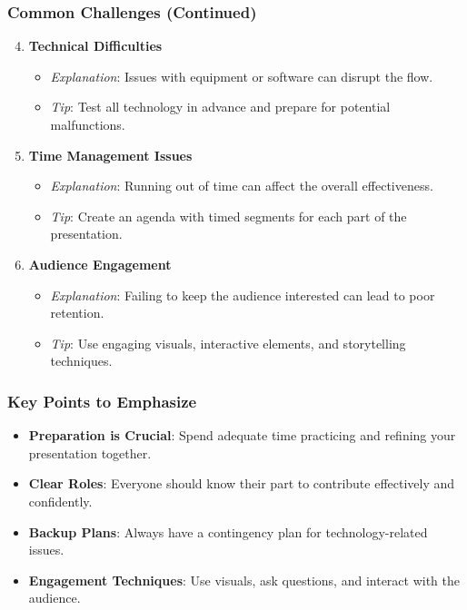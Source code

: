 \documentclass[aspectratio=169]{beamer}
\begin{document}
\begin{frame}[fragile]
  \frametitle{Common Challenges (Continued)}
  \begin{enumerate}
    \setcounter{enumi}{3} %
    \item \textbf{Technical Difficulties}
      \begin{itemize}
        \item \textit{Explanation}: Issues with equipment or software can disrupt the flow.
        \item \textit{Tip}: Test all technology in advance and prepare for potential malfunctions.
      \end{itemize}
    
    \item \textbf{Time Management Issues}
      \begin{itemize}
        \item \textit{Explanation}: Running out of time can affect the overall effectiveness.
        \item \textit{Tip}: Create an agenda with timed segments for each part of the presentation.
      \end{itemize}

    \item \textbf{Audience Engagement}
      \begin{itemize}
        \item \textit{Explanation}: Failing to keep the audience interested can lead to poor retention.
        \item \textit{Tip}: Use engaging visuals, interactive elements, and storytelling techniques.
      \end{itemize}
  \end{enumerate}
\end{frame}

\begin{frame}[fragile]
  \frametitle{Key Points to Emphasize}
  \begin{itemize}
    \item \textbf{Preparation is Crucial}: Spend adequate time practicing and refining your presentation together.
    \item \textbf{Clear Roles}: Everyone should know their part to contribute effectively and confidently.
    \item \textbf{Backup Plans}: Always have a contingency plan for technology-related issues.
    \item \textbf{Engagement Techniques}: Use visuals, ask questions, and interact with the audience.
  \end{itemize}
\end{frame}
\end{document}
